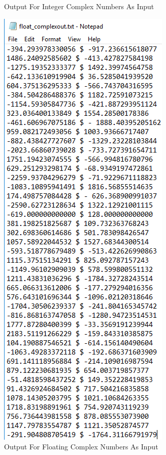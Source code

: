 \documentclass[12pt, titlepage]{article}
\begin{document}
\begin{figure}[h!]
\begin{minipage}[b]{0.44\textwidth}
\caption{Output For Integer Complex Numbers As Input}
\label{Fig_OutputComplex} 
\end{minipage}
\hfill
\begin{minipage}[b]{0.49\textwidth}
 \includegraphics[width=\textwidth]{Output_floatingComplex}
\caption{Output For Floating Complex Numbers As Input}
\label{Fig_Outputfloating} 
\end{minipage}
\end{figure}
		
\end{document}
